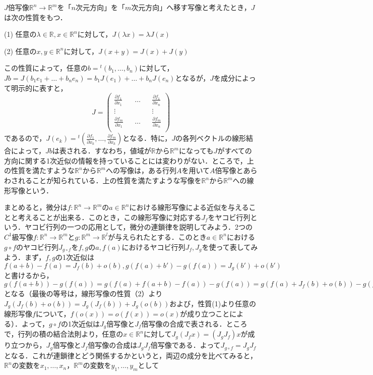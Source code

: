 \documentclass{jsarticle}
\def\vecb{\begin{pmatrix}}
\def\vece{\end{pmatrix}}
\def\realnum{{\mathbb R}}
\def\dfrac{\displaystyle\frac}
\def\tenchi{{}^t\!}
\def\delxkfo{\dfrac{\partial f_1}{\partial x_k}}
\def\delxkfm{\dfrac{\partial f_m}{\partial x_k}}
\def\delxofo{\dfrac{\partial f_1}{\partial x_1}}
\def\delxofm{\dfrac{\partial f_m}{\partial x_1}}
\def\delxnfo{\dfrac{\partial f_1}{\partial x_n}}
\def\delxnfm{\dfrac{\partial f_m}{\partial x_n}}
\begin{document}
$J$倍写像$\realnum^n\rightarrow\realnum^m$を「$n$次元方向」を「$m$次元方向」へ移す写像と考えたとき，$J$は次の性質をもつ．
\begin{description}
\item{(1)} 任意の$\lambda\in\realnum, x\in\realnum^n$に対して，$J(\lambda x)=\lambda J(x)$
\item{(2)} 任意の$x,y\in\realnum^n$に対して，$J(x+y)=J(x)+J(y)$
\end{description}
この性質によって，任意の$b=\tenchi(b_1,\dots,b_n)$に対して，$Jb=J(b_1e_1+\dots+ b_ne_n)=b_1J(e_1)+\dots+b_nJ(e_n)$となるが，$J$を成分によって明示的に表すと，
$$
J=\vecb \delxofo && \dots && \delxnfo \\ \vdots && && \vdots \\ \delxofm && \dots&&\delxnfm \\ \vece
$$
であるので，$J(e_k)=\tenchi\left(\delxkfo,\dots,\delxkfm\right)$となる．特に，$J$の各列ベクトルの線形結合によって，$Jb$は表される．すなわち，値域が$\realnum$から$\realnum^m$になっても$J$がすべての方向に関する1次近似の情報を持っていることには変わりがない．ところで，上の性質を満たすような$\realnum^n$から$\realnum^m$への写像は，ある行列$A$を用いて$A$倍写像とあらわされることが知られている．上の性質を満たすような写像を$\realnum^n$から$\realnum^m$への線形写像という．


まとめると，微分は$f:\realnum^n\rightarrow\realnum^m$の$a\in\realnum^n$における線形写像による近似を与えることと考えることが出来る．このとき，この線形写像に対応する$J_f$をヤコビ行列という．ヤコビ行列の一つの応用として，微分の連鎖律を説明してみよう．2つの$C^1$級写像$f:\realnum^n\rightarrow\realnum^m$と$g:\realnum^m\rightarrow\realnum^l$が与えられたとする．このとき$a\in\realnum^n$における$g\circ f$のヤコビ行列$J_{g\circ f}$を$f,g$の$a,f(a)$におけるヤコビ行列$J_f,J_g$を使って表してみよう．まず，$f,g$の1次近似は$f(a+b)-f(a)=J_f(b)+o(b),g(f(a)+b')-g(f(a))=J_g(b')+o(b')$と書けるから，$g(f(a+b))-g(f(a))=g(f(a)+f(a+b)-f(a))-g(f(a))=g(f(a)+J_f(b)+o(b))-g(f(a))=J_g(J_f(b)+o(b))+o(J_f(b)+o(b))=J_g(J_f(b))+o(b)$となる（最後の等号は，線形写像の性質（2）より$J_g(J_f(b)+o(b))=J_g(J_f(b))+J_g(o(b))$および，性質(1)より任意の線形写像$f$について，$f(o(x))=o(f(x))=o(x)$が成り立つことによる）．よって，$g\circ f$の1次近似は$J_g$倍写像と$J_f$倍写像の合成で表される．ところで，行列の積の結合法則より，任意の$x\in\realnum^n$に対して$J_g(J_fx)=(J_gJ_f)x$が成り立つから，$J_g$倍写像と$J_f$倍写像の合成は$J_gJ_f$倍写像である．よって$J_{g\circ f}=J_gJ_f$となる．これが連鎖律とどう関係するかというと，両辺の成分を比べてみると，$\realnum^n$の変数を$x_1,\dots,x_n$，$\realnum^m$の変数を$y_1,\dots,y_m$として
\end{document}
